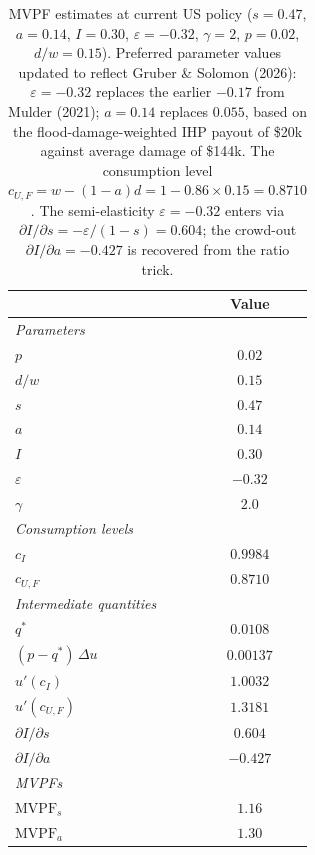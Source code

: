 \documentclass[12pt]{article}
\begin{document}
\begin{table}[h]
\centering
\renewcommand{\arraystretch}{1.4}
\begin{tabular}{lc}
\toprule
& \textbf{Value} \\
\midrule
\multicolumn{2}{l}{\textit{Parameters}} \\
$p$           & $0.02$ \\
$d/w$         & $0.15$ \\
$s$           & $0.47$ \\
$a$           & $0.14$ \\
$I$           & $0.30$ \\
$\varepsilon$ & $-0.32$ \\
$\gamma$      & $2.0$ \\
\midrule
\multicolumn{2}{l}{\textit{Consumption levels}} \\
$c_I$     & $0.9984$ \\
$c_{U,F}$ & $0.8710$ \\
\midrule
\multicolumn{2}{l}{\textit{Intermediate quantities}} \\
$q^*$                         & $0.0108$ \\
$(p - q^*)\,\Delta u$         & $0.00137$ \\
$u'(c_I)$                     & $1.0032$ \\
$u'(c_{U,F})$                 & $1.3181$ \\
$\partial I/\partial s$       & $0.604$ \\
$\partial I/\partial a$       & $-0.427$ \\
\midrule
\multicolumn{2}{l}{\textit{MVPFs}} \\
$\mathrm{MVPF}_s$ & $\mathbf{1.16}$ \\
$\mathrm{MVPF}_a$ & $\mathbf{1.30}$ \\
\bottomrule
\end{tabular}
\caption{MVPF estimates at current US policy ($s = 0.47$, $a = 0.14$, $I = 0.30$, $\varepsilon = -0.32$, $\gamma = 2$, $p = 0.02$, $d/w = 0.15$). Preferred parameter values updated to reflect Gruber \& Solomon (2026): $\varepsilon = -0.32$ replaces the earlier $-0.17$ from Mulder (2021); $a = 0.14$ replaces $0.055$, based on the flood-damage-weighted IHP payout of \$20k against average damage of \$144k. The consumption level $c_{U,F} = w - (1-a)d = 1 - 0.86 \times 0.15 = 0.8710$. The semi-elasticity $\varepsilon = -0.32$ enters via $\partial I/\partial s = -\varepsilon/(1-s) = 0.604$; the crowd-out $\partial I/\partial a = -0.427$ is recovered from the ratio trick.}
\label{tab:mvpf}
\end{table}
\end{document}
